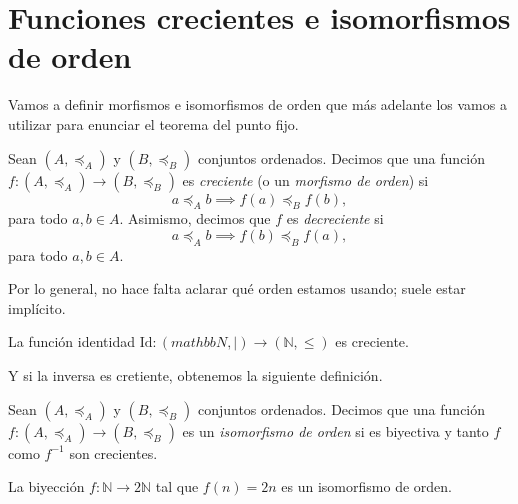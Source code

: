 \section{Funciones crecientes e isomorfismos de orden}

Vamos a definir morfismos e isomorfismos de orden que más adelante los vamos a utilizar para enunciar el teorema del punto fijo.

\begin{definition}
	Sean $(A, \preceq_A)$ y $(B, \preceq_B)$ conjuntos ordenados. Decimos que una función $f : (A, \preceq_A) \to (B, \preceq_B)$ es \emph{creciente} (o un \emph{morfismo de orden}) si
	\begin{equation*}
		a \preceq_A b \implies f(a) \preceq_B f(b),
	\end{equation*}
	para todo $a, b \in A$. Asimismo, decimos que $f$ es \emph{decreciente} si
	\begin{equation*}
		a \preceq_A b \implies f(b) \preceq_B f(a),
	\end{equation*}
	para todo $a, b \in A$.
\end{definition}

Por lo general, no hace falta aclarar qué orden estamos usando; suele estar implícito.

\begin{example}
	La función identidad $\mathrm{Id} : (mathbb{N}, \mid) \to (\mathbb{N}, \leq)$ es creciente.
\end{example}

Y si la inversa es cretiente, obtenemos la siguiente definición.

\begin{definition}
	Sean $(A, \preceq_A)$ y $(B, \preceq_B)$ conjuntos ordenados. Decimos que una función $f : (A, \preceq_A) \to (B, \preceq_B)$ es un \emph{isomorfismo de orden} si es biyectiva y tanto $f$ como $f^{-1}$ son crecientes.
\end{definition}

\begin{example}
	La biyección $f : \mathbb{N} \to 2\mathbb{N}$ tal que $f(n) = 2n$ es un isomorfismo de orden.
\end{example}








